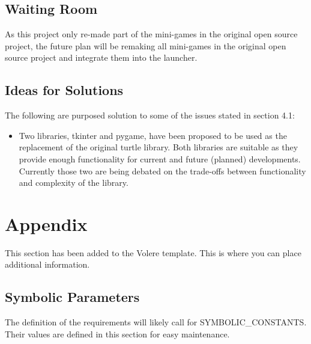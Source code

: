 \documentclass[12pt, titlepage]{article}
\begin{document}
\subsection{Waiting Room}

As this project only re-made part of the mini-games in the original open source project, the future plan will be remaking all mini-games in the original open source project and integrate them into the launcher.

\subsection{Ideas for Solutions}

The following are purposed solution to some of the issues stated in section 4.1:
\begin{itemize}
    \item Two libraries, tkinter and pygame, have been proposed to be used as the replacement of the original turtle library. Both libraries are suitable as they provide enough functionality for current and future (planned) developments. Currently those two are being debated on the trade-offs between functionality and complexity of the library.
\end{itemize}





\newpage

\section{Appendix}

This section has been added to the Volere template.  This is where you can place
additional information.

\subsection{Symbolic Parameters}

The definition of the requirements will likely call for SYMBOLIC\_CONSTANTS.
Their values are defined in this section for easy maintenance.
\end{document}
